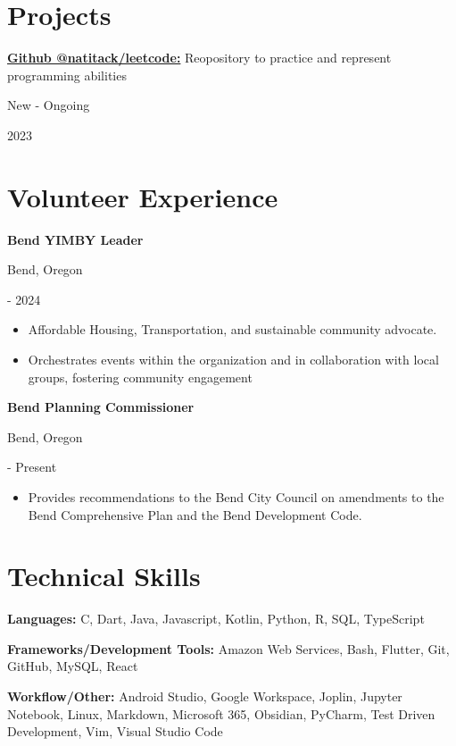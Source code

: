 \documentclass[10pt]{article}
\newcommand{\triline}[3]{%
    \parbox[t][][t]{.4\linewidth}{ #1 }%
    \parbox[t][][t]{.4\linewidth}{ #2 }%
    \parbox[t][][t]{.2\linewidth}{\raggedleft #3 }%
    \vspace{1ex}
}
\newcommand{\publication}[3]{%
    \parbox[t][][t]{.8\linewidth}{ #1 }%
    \parbox[t][][t]{.05\linewidth}{ #2 }%
    \parbox[t][][t]{.15\linewidth}{\raggedright #3 }%
    \vspace{0.5ex}
}
\newlength{\listpostvertical}
\begin{document}
\section{Projects}

\publication%
    {
    \textbf{ 
    \href{https://github.com/natitack/leetcode}%
          {Github @natitack/leetcode:}} Reopository to practice and represent programming abilities}%

    {New - Ongoing}%
    {2023}

    \section{Volunteer Experience}

    \triline{\textbf{Bend YIMBY Leader}}{Bend, Oregon}{2021 - 2024}
    \begin{itemize}[nosep]
    \item Affordable Housing, Transportation, and sustainable community advocate. 
    \item Orchestrates events within the organization and in collaboration with local groups, fostering community engagement
    
    \end{itemize}
    \vspace{\listpostvertical}
    
    \triline{\textbf{Bend Planning Commissioner}}{Bend, Oregon}{ 2024 - Present}
    \vspace{\listpostvertical}
    
    \begin{itemize}[nosep]
    \item Provides recommendations to the Bend City Council on amendments to the Bend Comprehensive Plan and the Bend Development Code. 

    \end{itemize}

\section{Technical Skills}

\begin{trivlist}
    \item \textbf{Languages:}  C, Dart, Java, Javascript, Kotlin, Python, R, SQL, TypeScript
    \item \textbf{Frameworks/Development Tools:} Amazon Web Services, Bash, Flutter, Git, GitHub, MySQL, React
    \item \textbf{Workflow/Other:} Android Studio, Google Workspace, Joplin, Jupyter Notebook, Linux, Markdown, Microsoft 365, Obsidian, PyCharm, Test Driven Development, 
    Vim, Visual Studio Code
\end{trivlist}
\end{document}
